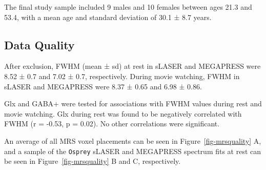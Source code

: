 \documentclass[
true
]{sn-jnl}
\begin{document}
The final study sample included 9 males and 10 females between ages 21.3
and 53.4, with a mean age and standard deviation of 30.1 ± 8.7 years.

\subsection{Data Quality}\label{data-quality}

After exclusion, FWHM (mean ± sd) at rest in sLASER and MEGAPRESS were
8.52 ± 0.7 and 7.02 ± 0.7, respectively. During movie watching, FWHM in
sLASER and MEGAPRESS were 8.37 ± 0.65 and 6.98 ± 0.86.

Glx and GABA+ were tested for associations with FWHM values during rest
and movie watching. Glx during rest was found to be negatively
correlated with FWHM (r = -0.53, p = 0.02). No other correlations were
significant.

An average of all MRS voxel placements can be seen in
Figure~\ref{fig-mrsquality} A, and a sample of the \texttt{Osprey}
sLASER and MEGAPRESS spectrum fits at rest can be seen in
Figure~\ref{fig-mrsquality} B and C, respectively.
\end{document}
